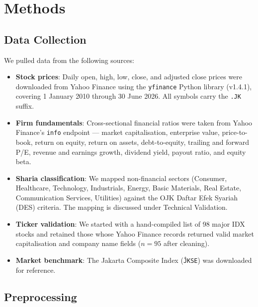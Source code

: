 \documentclass[11pt,a4paper]{article}
\begin{document}
\section{Methods}

\subsection{Data Collection}

We pulled data from the following sources:

\begin{itemize}[leftmargin=*,nosep]
\item \textbf{Stock prices}: Daily open, high, low, close, and adjusted close prices were downloaded from Yahoo Finance using the \texttt{yfinance} Python library (v1.4.1), covering 1 January 2010 through 30 June 2026. All symbols carry the \texttt{.JK} suffix.
\item \textbf{Firm fundamentals}: Cross-sectional financial ratios were taken from Yahoo Finance's \texttt{info} endpoint — market capitalisation, enterprise value, price-to-book, return on equity, return on assets, debt-to-equity, trailing and forward P/E, revenue and earnings growth, dividend yield, payout ratio, and equity beta.
\item \textbf{Sharia classification}: We mapped non-financial sectors (Consumer, Healthcare, Technology, Industrials, Energy, Basic Materials, Real Estate, Communication Services, Utilities) against the OJK Daftar Efek Syariah (DES) criteria. The mapping is discussed under Technical Validation.
\item \textbf{Ticker validation}: We started with a hand-compiled list of 98 major IDX stocks and retained those whose Yahoo Finance records returned valid market capitalisation and company name fields ($n = 95$ after cleaning).
\item \textbf{Market benchmark}: The Jakarta Composite Index (\texttt{\^JKSE}) was downloaded for reference.
\end{itemize}

\subsection{Preprocessing}
\end{document}
